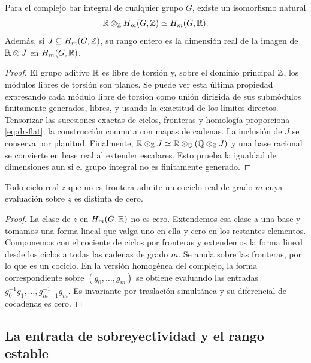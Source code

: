 \begin{lema}
\label{lem:dr-flat}
Para el complejo bar integral de cualquier grupo $G$, existe un isomorfismo natural
\begin{equation}
 \mathbb{R}\otimes_{\mathbb{Z}} H_m(G,\mathbb{Z})\simeq H_m(G,\mathbb{R}).
 \label{eq:dr-flat}
\end{equation}
Además, si $J\subseteq H_m(G,\mathbb{Z})$, su rango entero es la dimensión real de la imagen de $\mathbb{R}\otimes J$ en $H_m(G,\mathbb{R})$.
\end{lema}
\begin{proof}
El grupo aditivo $\mathbb{R}$ es libre de torsión y, sobre el dominio principal $\mathbb{Z}$, los módulos libres de torsión son planos. Se puede ver esta última propiedad expresando cada módulo libre de torsión como unión dirigida de sus submódulos finitamente generados, libres, y usando la exactitud de los límites directos. Tensorizar las sucesiones exactas de ciclos, fronteras y homología proporciona \eqref{eq:dr-flat}; la construcción conmuta con mapas de cadenas. La inclusión de $J$ se conserva por planitud. Finalmente, $\mathbb{R}\otimes_{\mathbb{Z}} J\simeq\mathbb{R}\otimes_{\mathbb{Q}}(\mathbb{Q}\otimes_{\mathbb{Z}} J)$ y una base racional se convierte en base real al extender escalares. Esto prueba la igualdad de dimensiones aun si el grupo integral no es finitamente generado.
\end{proof}

\begin{lema}
\label{lem:dr-sep}
Todo ciclo real $z$ que no es frontera admite un cociclo real de grado $m$ cuya evaluación sobre $z$ es distinta de cero.
\end{lema}
\begin{proof}
La clase de $z$ en $H_m(G,\mathbb{R})$ no es cero. Extendemos esa clase a una base y tomamos una forma lineal que valga uno en ella y cero en los restantes elementos. Componemos con el cociente de ciclos por fronteras y extendemos la forma lineal desde los ciclos a todas las cadenas de grado $m$. Se anula sobre las fronteras, por lo que es un cociclo. En la versión homogénea del complejo, la forma correspondiente sobre $(g_0,\ldots,g_m)$ se obtiene evaluando las entradas $g_0^{-1}g_1,\ldots,g_{m-1}^{-1}g_m$. Es invariante por traslación simultánea y su diferencial de cocadenas es cero.
\end{proof}

\subsection{La entrada de sobreyectividad y el rango estable}

